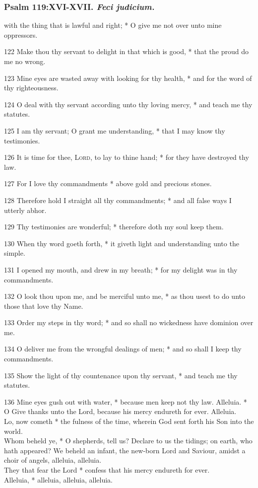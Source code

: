 \subsubsection{Psalm 119:XVI-XVII. \textit{Feci judicium.}}
 with the thing that is lawful and right; * O give me not over unto mine oppressors.
\par
    122 Make thou thy servant to delight in that which is good, * that the proud do me no wrong.
\par
    123 Mine eyes are wasted away with looking for thy health, * and for the word of thy righteousness.
\par
    124 O deal with thy servant according unto thy loving mercy, * and teach me thy statutes.
\par
    125 I am thy servant; O grant me understanding, * that I may know thy testimonies.
\par
    126 It is time for thee, \textsc{Lord}, to lay to thine hand; * for they have destroyed thy law.
\par
    127 For I love thy commandments * above gold and precious stones.
\par
    128 Therefore hold I straight all thy commandments; * and all false ways I utterly abhor.
\par
    129 Thy testimonies are wonderful; * therefore doth my soul keep them.
\par
    130 When thy word goeth forth, * it giveth light and understanding unto the simple.
\par
    131 I opened my mouth, and drew in my breath; * for my delight was in thy commandments.
\par
    132 O look thou upon me, and be merciful unto me, * as thou usest to do unto those that love thy Name.
\par
    133 Order my steps in thy word; * and so shall no wickedness have dominion over me.
\par
    134 O deliver me from the wrongful dealings of men; * and so shall I keep thy commandments.
\par
    135 Show the light of thy countenance upon thy servant, * and teach me thy statutes.
\par
    136 Mine eyes gush out with water, * because men keep not thy law.
 Alleluia. * O Give thanks unto the Lord, because his mercy endureth for ever. Alleluia.\\
 Lo, now cometh * the fulness of the time, wherein God sent forth his Son into the world.\\
 Whom beheld ye, * O shepherds, tell us? Declare to us the tidings; on earth, who hath appeared? We beheld an infant, the new-born Lord and Saviour, amidst a choir of angels, alleluia, alleluia.\\
 They that fear the Lord * confess that his mercy endureth for ever.\\
 Alleluia, * alleluia, alleluia, alleluia.
